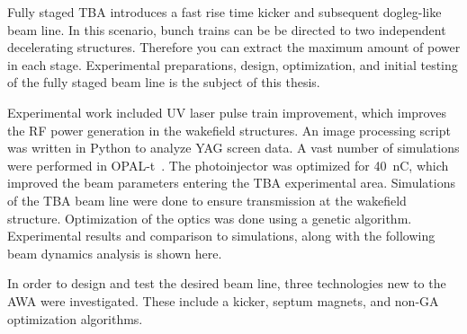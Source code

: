 Fully staged TBA introduces a fast rise time kicker
and subsequent dogleg-like beam line. In this scenario, bunch trains can be 
be directed to two independent decelerating structures. 
Therefore you can extract the maximum amount of power in each stage.
Experimental preparations, design, optimization, 
and initial testing of the fully staged beam line
is the subject of this thesis. 


Experimental work included UV laser pulse train improvement, 
which improves the RF power generation in the wakefield structures.
An image processing script was written in Python to analyze YAG screen data. 
A vast number of simulations were performed in OPAL-t~\cite{opal}.
The photoinjector was optimized for \SI{40}{nC}, 
which improved the beam parameters entering the TBA experimental area.
Simulations of the TBA beam line were done to ensure transmission at
the wakefield structure. Optimization of the optics was done using 
a genetic algorithm. 
Experimental results and comparison to simulations, along 
with the following beam dynamics analysis is shown here.





In order to design and test the desired beam line, three technologies 
new to the AWA were investigated. These include a kicker, septum magnets, 
and non-GA optimization algorithms.

